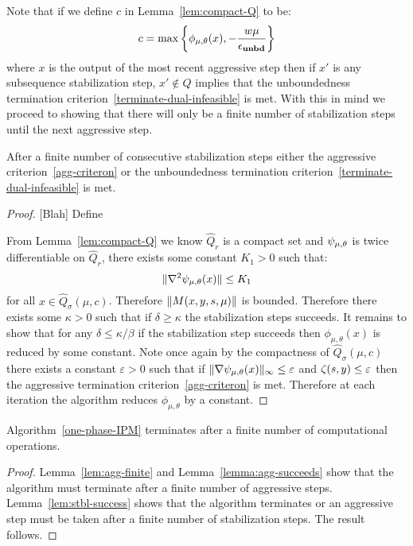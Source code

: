 \documentclass{article}
\begin{document}
Note that if we define $c$ in Lemma~\ref{lem:compact-Q} to be:
$$
c = \max \left\{ \phi_{\mu,\theta}(x) , -\frac{w \mu}{\epsilon_{\textbf{unbd}}} \right\}  
$$
where $x$ is the output of the most recent aggressive step then if $x'$ is any subsequence stabilization step, $x' \not\in Q$ implies that the unboundedness termination criterion~\eqref{terminate-dual-infeasible} is met. With this in mind we proceed to showing that there will only be a finite number of stabilization steps until the next aggressive step.

\begin{lemma}
After a finite number of consecutive stabilization steps either the aggressive criterion~\eqref{agg-criteron} or the unboundedness termination criterion~\eqref{terminate-dual-infeasible}  is met.
\label{lem:stbl-success}
\end{lemma}

\begin{proof}

[Blah]
Define 

From Lemma~\ref{lem:compact-Q} we know $\hat{Q}_{r}$ is a compact set and $\psi_{\mu,\theta}$ is twice differentiable on $\hat{Q}_{r}$, there exists some constant $K_{1} > 0$ such that:
$$
\| \nabla^2 \psi_{\mu,\theta}(x)  \| \le K_{1}
$$
for all $x \in \hat{Q}_{\sigma}(\mu, c)$. Therefore $\| M(x, y, s, \mu) \| $ is bounded. Therefore there exists some $\kappa > 0$ such that if $\delta \ge \kappa$ the stabilization steps succeeds. It remains to show that for any $\delta \le \kappa / \beta$ if the stabilization step succeeds then $\phi_{\mu,\theta}(x)$ is reduced by some constant. Note once again by the compactness of $\hat{Q}_{\sigma}(\mu, c)$ there exists a  constant $\varepsilon > 0$ such that if $\| \nabla \psi_{\mu,\theta}(x) \|_{\infty} \le \varepsilon$ and $\mathcal{\zeta}(s,y) \le \varepsilon$ then the aggressive termination criterion~\eqref{agg-criteron} is met. Therefore at each iteration the algorithm reduces $\phi_{\mu,\theta}$ by a constant.
\end{proof}

\begin{theorem}
Algorithm~\ref{one-phase-IPM} terminates after a finite number of computational operations.
\end{theorem}

\begin{proof}
Lemma~\ref{lem:agg-finite} and Lemma~\ref{lemma:agg-succeeds} show that the algorithm must terminate after a finite number of aggressive steps.
Lemma~\ref{lem:stbl-success} shows that the algorithm terminates or an aggressive step must be taken after a finite number of stabilization steps. The result follows.
\end{proof}
\end{document}
